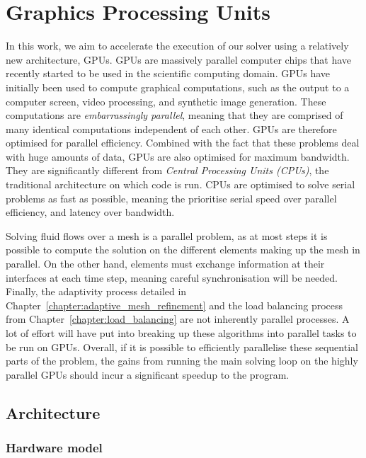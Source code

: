 \chapter{Graphics Processing Units} \label{chapter:graphics_processing_units}

In this work, we aim to accelerate the execution of our solver using a relatively new architecture,
GPUs. GPUs are massively parallel computer chips that have recently started to be used in the
scientific computing domain. GPUs have initially been used to compute graphical computations, such
as the output to a computer screen, video processing, and synthetic image generation. These
computations are \textit{embarrassingly parallel}, meaning that they are comprised of many identical
computations independent of each other. GPUs are therefore optimised for parallel efficiency.
Combined with the fact that these problems deal with huge amounts of data, GPUs are also optimised
for maximum bandwidth. They are significantly different from \textit{Central Processing Units
(CPUs)}, the traditional architecture on which code is run. CPUs are optimised to solve serial
problems as fast as possible, meaning the prioritise serial speed over parallel efficiency, and
latency over bandwidth. 

Solving fluid flows over a mesh is a parallel problem, as at most steps it is possible to compute
the solution on the different elements making up the mesh in parallel. On the other hand, elements
must exchange information at their interfaces at each time step, meaning careful synchronisation
will be needed. Finally, the adaptivity process detailed in
Chapter~\ref{chapter:adaptive_mesh_refinement} and the load balancing process from
Chapter~\ref{chapter:load_balancing} are not inherently parallel processes. A lot of effort will
have put into breaking up these algorithms into parallel tasks to be run on GPUs. Overall, if it is
possible to efficiently parallelise these sequential parts of the problem, the gains from running
the main solving loop on the highly parallel GPUs should incur a significant speedup to the program.

\section{Architecture} \label{section:graphics_processing_units:architecture}
\subsection{Hardware model} \label{section:graphics_processing_units:architecture:hardware_model}

